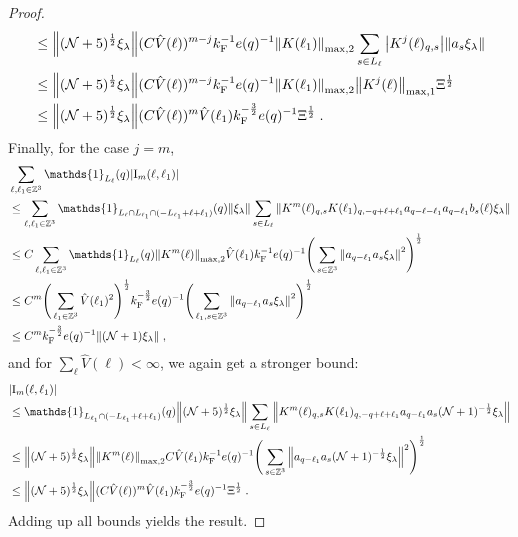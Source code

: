 \documentclass[12pt,a4paper]{article}
\numberwithin{equation}{section}
\newcommand{\1}{\mathbb{I}}
\newcommand{\F}{\mathrm{F}}
\newcommand{\I}{\mathrm{I}}
\newcommand{\kF}{k_\F}
\newcommand{\Zstar}{\mathbb{Z}^3} %
\newcommand{\Z}{\mathbb{Z}}
\newcommand{\NN}{\mathcal{N}}
\newcommand{\half}{\frac{1}{2}}
\theoremstyle{plain}
\theoremstyle{definition}
\theoremstyle{remark}
\theoremstyle{plain}
\theoremstyle{definition}
\theoremstyle{remark}
\begin{document}
\begin{proof}
\begin{align}
	&\leq \norm{ (\NN+5)^{\half} \xi_\lambda}
		(C \hat{V}(\ell))^{m-j} \kF^{-1} e(q)^{-1}
		\norm{K(\ell_1)}_{\max,2}
		\sum_{s\in L_{\ell}}\abs{K^{j}(\ell)_{q,s}}
		\norm{a_s \xi_\lambda }		
	\nonumber\\
	&\leq \norm{(\NN+5)^\half \xi_\lambda }
		(C \hat{V}(\ell))^{m-j} \kF^{-1} e(q)^{-1}
		\norm{ K(\ell_1) }_{\max,2}
		\norm{ K^{j}(\ell)}_{\mathrm{max,1}} \Xi^\half \nonumber \\
	&\leq \norm{(\NN+5)^\half \xi_\lambda }
		(C \hat{V}(\ell))^m
		\hat{V}(\ell_1)
		\kF^{-\frac 32} e(q)^{-1} \Xi^\half \;.
\end{align}
Finally, for the case $ j = m $,
\begin{align}
	&\sum_{\ell,\ell_1 \in \Zstar} \mathds{1}_{L_\ell}(q) |\I_m(\ell, \ell_1)| \nonumber\\
	&\leq \sum_{\ell,\ell_1 \in \Zstar} \mathds{1}_{L_\ell \cap L_{\ell_1} \cap (-L_{\ell_1} + \ell + \ell_1)}(q) \norm{\xi_\lambda}
		\sum\limits_{s \in L_{\ell}}
		\norm{ K^m(\ell)_{q,s} K(\ell_1)_{q,-q+\ell+\ell_1} a_{q-\ell-\ell_1} a_{q-\ell_1} b_{s}(\ell) \xi_\lambda } \nonumber\\
	&\leq C
		\sum_{\ell,\ell_1 \in \Zstar} \mathds{1}_{L_\ell}(q)
		\norm{K^m(\ell)}_{\max,2} \hat{V}(\ell_1) \kF^{-1} e(q)^{-1}
		\Bigg(\sum\limits_{s \in \Z^3} \norm{ a_{q-\ell_1} a_s \xi_\lambda }^2\Bigg)^\half \nonumber\\
	&\leq C^m
		\Bigg( \sum_{\ell_1 \in \Zstar} \hat{V}(\ell_1)^2 \Bigg)^{\half}
		\kF^{-\frac 32} e(q)^{-1}
		\Bigg(\sum\limits_{\ell_1,s \in \Z^3} \norm{ a_{q-\ell_1} a_s \xi_\lambda }^2\Bigg)^\half \nonumber\\
	&\leq C^m \kF^{-\frac 32} e(q)^{-1} \norm{(\NN+1) \xi_\lambda } \;, \label{eq:estEQ1123_Coulomb}
\end{align}
and for $ \sum_{\ell} \hat{V}(\ell) < \infty $, we again get a stronger bound:
\begin{align}
	&|\I_m(\ell, \ell_1)| \nonumber\\
	&\leq \mathds{1}_{L_{\ell_1} \cap (-L_{\ell_1} + \ell + \ell_1)}(q) \norm{(\NN+5)^{\half} \xi_\lambda}
		\sum_{s \in L_{\ell}}
		\norm{ K^m(\ell)_{q,s} K(\ell_1)_{q,-q+\ell+\ell_1} a_{q-\ell_1} a_s (\NN+1)^{-\half} \xi_\lambda } \nonumber\\
	&\leq \norm{(\NN+5)^{\half} \xi_\lambda}
		\norm{K^m(\ell)}_{\max,2}
		C \hat{V}(\ell_1) \kF^{-1} e(q)^{-1}
		\Bigg(\sum_{s \in \Z^3}  \norm{ a_{q-\ell_1} a_s (\NN+1)^{-\half} \xi_\lambda }^2\Bigg)^\half \nonumber\\
	&\leq \norm{(\NN+5)^\half \xi_\lambda }
		(C \hat{V}(\ell))^m
		\hat{V}(\ell_1)
		\kF^{-\frac 32} e(q)^{-1} \Xi^\half \;. \label{eq:estEQ1123}
\end{align}
Adding up all bounds yields the result.
\end{proof}
\end{document}
